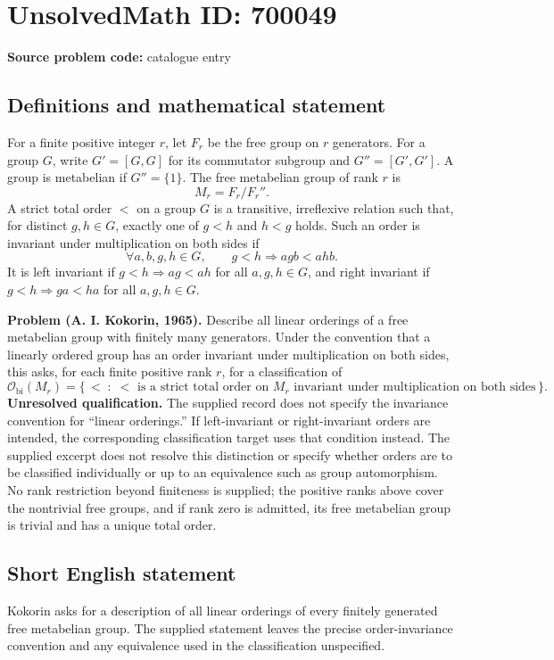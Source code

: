 \documentclass[11pt]{article}
\begin{document}
\section*{UnsolvedMath ID: 700049}
\textbf{Source problem code:} catalogue entry
\subsection{Definitions and mathematical statement}
For a finite positive integer \(r\), let \(F_r\) be the free group on \(r\) generators. For a group \(G\), write \(G'=[G,G]\) for its commutator subgroup and \(G''=[G',G']\). A group is metabelian if \(G''=\{1\}\). The free metabelian group of rank \(r\) is
\[
M_r=F_r/F_r''.
\]
A strict total order \(<\) on a group \(G\) is a transitive, irreflexive relation such that, for distinct \(g,h\in G\), exactly one of \(g<h\) and \(h<g\) holds. Such an order is invariant under multiplication on both sides if
\[
\forall a,b,g,h\in G,\qquad g<h\Longrightarrow agb<ahb.
\]
It is left invariant if \(g<h\Longrightarrow ag<ah\) for all \(a,g,h\in G\), and right invariant if \(g<h\Longrightarrow ga<ha\) for all \(a,g,h\in G\).

\textbf{Problem (A. I. Kokorin, 1965).} Describe all linear orderings of a free metabelian group with finitely many generators. Under the convention that a linearly ordered group has an order invariant under multiplication on both sides, this asks, for each finite positive rank \(r\), for a classification of
\[
\mathcal O_{\mathrm{bi}}(M_r)
=\{\,<\;:\;<\text{ is a strict total order on }M_r\text{ invariant under multiplication on both sides}\,\}.
\]
\textbf{Unresolved qualification.} The supplied record does not specify the invariance convention for ``linear orderings.'' If left-invariant or right-invariant orders are intended, the corresponding classification target uses that condition instead. The supplied excerpt does not resolve this distinction or specify whether orders are to be classified individually or up to an equivalence such as group automorphism. No rank restriction beyond finiteness is supplied; the positive ranks above cover the nontrivial free groups, and if rank zero is admitted, its free metabelian group is trivial and has a unique total order.
\subsection{Short English statement}
Kokorin asks for a description of all linear orderings of every finitely generated free metabelian group. The supplied statement leaves the precise order-invariance convention and any equivalence used in the classification unspecified.
\end{document}
